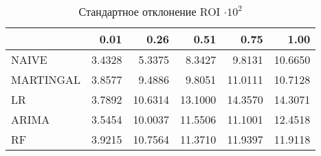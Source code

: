 \begin{table}[h]
\caption{Стандартное отклонение ROI $\cdot 10^2$}
\label{tab:roi_std}
\begin{tabular}{lrrrrr}
\toprule
 &  0.01 &  0.26 &  0.51 &  0.75 &  1.00 \\
\midrule
NAIVE & 3.4328 & 5.3375 & 8.3427 & 9.8131 & 10.6650 \\
MARTINGAL & 3.8577 & 9.4886 & 9.8051 & 11.0111 & 10.7128 \\
LR & 3.7892 & 10.6314 & 13.1000 & 14.3570 & 14.3071 \\
ARIMA & 3.5454 & 10.0037 & 11.5506 & 11.1001 & 12.4518 \\
RF & 3.9215 & 10.7564 & 11.3710 & 11.9397 & 11.9118 \\
\bottomrule
\end{tabular}
\end{table}
